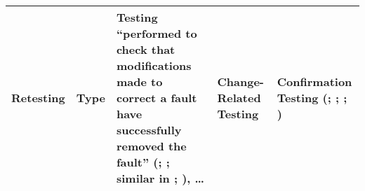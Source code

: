 \begin{table}[hbtp!]
\begin{tabularx}{\linewidth}{|m{1.8cm}|>{\raggedright\arraybackslash}m{3.5cm}|>{\raggedright\arraybackslash}X|>{\raggedright\arraybackslash}m{4.25cm}|>{\raggedright\arraybackslash}m{4.25cm}|}
        Retesting            & Type \citepISTQB{}                                                        & Testing ``performed to check that modifications made to correct a fault have successfully removed the fault'' (\citealp[p.~8]{IEEE2022}; \citeyear[p.~3]{IEEE2021a}; similar in \citeyear[p.~386]{IEEE2017}; \citealpISTQB{}), \dots{} & Change-Related Testing \citepISTQB{}                                                            & Confirmation Testing (\citealp[pp.~8, 35]{IEEE2022}; \citeyear[p.~3]{IEEE2021a}; \citeyear[p.~386]{IEEE2017}; \citealpISTQB{}) \\
        \hline
    \end{tabularx}
\end{table}